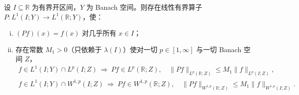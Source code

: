 \documentclass[../../main.tex]{subfiles}%
\begin{document}
\begin{proposition}\label{proposition:ch04-延拓}
设 $I\subseteq\mathbb{R}$ 为有界开区间，$Y$ 为 Banach 空间。则存在线性有界算子 $P:L^1(I;Y)\to L^1(\mathbb{R};Y)$，使：
\begin{enumerate}[(i)]
\item\label{item:ch04-延拓-i} $(Pf)(x)=f(x)$ 对几乎所有 $x\in I$；
\item\label{item:ch04-延拓-ii} 存在常数 $M_1>0$（只依赖于 $\lambda(I)$）使对一切 $p\in[1,\infty]$ 与一切 Banach 空间 $Z$，
\begin{align}
f\in L^1(I;Y)\cap L^p(I;Z)\ \Rightarrow\ Pf\in L^p(\mathbb{R};Z),\quad\|Pf\|_{L^p(\mathbb{R};Z)}\leqslant M_1\|f\|_{L^p(I;Z)}, \label{align:ch04-4.137a}
\end{align}
\begin{align}
f\in L^1(I;Y)\cap W^{1,p}(I;Z)\ \Rightarrow\ Pf\in W^{1,p}(\mathbb{R};Z),\quad\|Pf\|_{W^{1,p}(\mathbb{R};Z)}\leqslant M_1\|f\|_{W^{1,p}(I;Z)}. \label{align:ch04-4.137b}
\end{align}
\end{enumerate}
\end{proposition}
\end{document}
